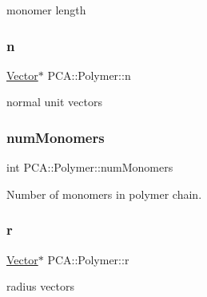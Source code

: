 monomer length 

\hypertarget{class_p_c_a_1_1_polymer_a7c71d8f5516ae0b0ead3929296135d1b}{}\label{class_p_c_a_1_1_polymer_a7c71d8f5516ae0b0ead3929296135d1b} 
\subsubsection{\texorpdfstring{n}{n}}
{\footnotesize\ttfamily \hyperlink{class_p_c_a_1_1_vector}{Vector}$\ast$ P\+C\+A\+::\+Polymer\+::n\hspace{0.3cm}{\ttfamily [private]}}



normal unit vectors 

\hypertarget{class_p_c_a_1_1_polymer_a8dadd2d6d6d65b79909f274acd63fd1e}{}\label{class_p_c_a_1_1_polymer_a8dadd2d6d6d65b79909f274acd63fd1e} 
\subsubsection{\texorpdfstring{num\+Monomers}{numMonomers}}
{\footnotesize\ttfamily int P\+C\+A\+::\+Polymer\+::num\+Monomers\hspace{0.3cm}{\ttfamily [private]}}



Number of monomers in polymer chain. 

\hypertarget{class_p_c_a_1_1_polymer_a9822e3b9c3420a04a689706b84e586ca}{}\label{class_p_c_a_1_1_polymer_a9822e3b9c3420a04a689706b84e586ca} 
\subsubsection{\texorpdfstring{r}{r}}
{\footnotesize\ttfamily \hyperlink{class_p_c_a_1_1_vector}{Vector}$\ast$ P\+C\+A\+::\+Polymer\+::r\hspace{0.3cm}{\ttfamily [private]}}



radius vectors 

\hypertarget{class_p_c_a_1_1_polymer_a0fd79e19a8c09a9e4c72903924151b5e}{}\label{class_p_c_a_1_1_polymer_a0fd79e19a8c09a9e4c72903924151b5e} 
